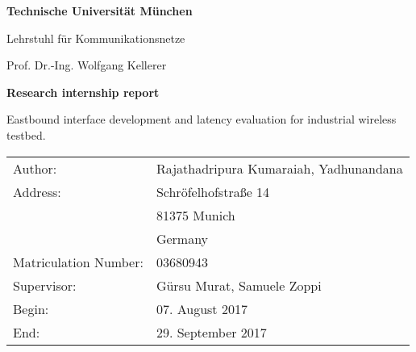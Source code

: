 \documentclass[12pt,a4paper]{report}
\begin{document}
\thispagestyle{empty}
\newpage

\vspace{5cm}
\begin{center}
    \epsfxsize=4cm
\end{center}

\parbox{15cm}{\begin{center} {\sf\bf 
                               \Large  Technische Universität München
                                \smallskip

                               \Large Lehrstuhl für Kommunikationsnetze
                               \smallskip
                              }

                              {\sf \large Prof. Dr.-Ing. Wolfgang Kellerer} 
              \end{center}}  %

\vspace{4cm}

\begin{center}
        {\bf\Huge Research internship report} %
\end{center}

\begin{center}
        \settowidth{\baselineskip}{0.4cm}
        {\LARGE 
        Eastbound interface development and latency evaluation for industrial wireless testbed.
        }
\end{center}

\vfill         
{\settowidth{\baselineskip}{0.2cm}
\large\begin{tabular}[l]{ll}
Author: & Rajathadripura Kumaraiah, Yadhunandana\\
Address: & Schröfelhofstraße 14\\
         & 81375 Munich\\
         & Germany\\
Matriculation Number: & 03680943\\
Supervisor: & Gürsu Murat, Samuele Zoppi\\
Begin: & 07. August 2017\\
End: & 29. September 2017
\end{tabular}}



%

\tableofcontents  

\end{document}

